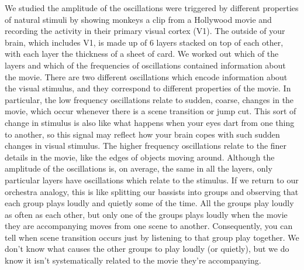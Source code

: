 We studied the amplitude of the oscillations were triggered by different properties of natural stimuli by showing monkeys a clip from a Hollywood movie and recording the activity in their primary visual cortex (\acs{V1}).
The outside of your brain, which includes \acs{V1}, is made up of \num{6} layers stacked on top of each other, with each layer the thickness of a sheet of card.
We worked out which of the layers and which of the frequencies of oscillations contained information about the movie.
There are two different oscillations which encode information about the visual stimulus, and they correspond to different properties of the movie.
In particular, the low frequency oscillations relate to sudden, coarse, changes in the movie, which occur whenever there is a scene transition or jump cut.
This sort of change in stimulus is also like what happens when your eyes dart from one thing to another, so this signal may reflect how your brain copes with such sudden changes in visual stimulus.
The higher frequency oscillations relate to the finer details in the movie, like the edges of objects moving around.
Although the amplitude of the oscillations is, on average, the same in all the layers, only particular layers have oscillations which relate to the stimulus.
If we return to our orchestra analogy, this is like splitting our bassists into groups and observing that each group plays loudly and quietly some of the time.
All the groups play loudly as often as each other, but only one of the groups plays loudly when the movie they are accompanying moves from one scene to another.
Consequently, you can tell when scene transition occurs just by listening to that group play together.
We don't know what causes the other groups to play loudly (or quietly), but we do know it isn't systematically related to the movie they're accompanying.

\endgroup
